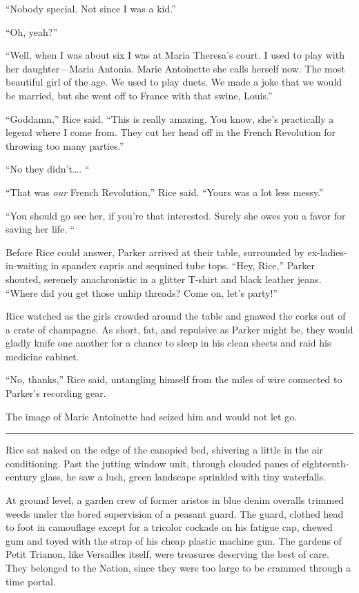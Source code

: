 ``Nobody special. Not since I was a kid.''

``Oh, yeah?''

``Well, when I was about six I was at Maria Theresa's court. I used to play with her daughter—Maria Antonia. Marie Antoinette she calls herself now. The most beautiful girl of the age. We used to play duets. We made a joke that we would be married, but she went off to France with that swine, Louis.''

``Goddamn,'' Rice said. ``This is really amazing. You know, she's practically a legend where I come from. They cut her head off in the French Revolution for throwing too many parties.''

``No they didn't\ldots. ``

``That was \textit{our} French Revolution,'' Rice said. ``Yours was a lot less messy.''

``You should go see her, if you're that interested. Surely she owes you a favor for saving her life. ``

Before Rice could answer, Parker arrived at their table, surrounded by ex-ladies-in-waiting in spandex capris and sequined tube tops. ``Hey, Rice,'' Parker shouted, serenely anachronistic in a glitter T-shirt and black leather jeans. ``Where did you get those unhip threads? Come on, let's party!''

Rice watched as the girls crowded around the table and gnawed the corks out of a crate of champagne. As short, fat, and repulsive as Parker might be, they would gladly knife one another for a chance to sleep in his clean sheets and raid his medicine cabinet.

``No, thanks,'' Rice said, untangling himself from the miles of wire connected to Parker's recording gear.

The image of Marie Antoinette had seized him and would not let go.

\fancybreak{* * *}

Rice sat naked on the edge of the canopied bed, shivering a little in the air conditioning. Past the jutting window unit, through clouded panes of eighteenth-century glass, he saw a lush, green landscape sprinkled with tiny waterfalls.

At ground level, a garden crew of former aristos in blue denim overalls trimmed weeds under the bored supervision of a peasant guard. The guard, clothed head to foot in camouflage except for a tricolor cockade on his fatigue cap, chewed gum and toyed with the strap of his cheap plastic machine gun. The gardens of Petit Trianon, like Versailles itself, were treasures deserving the best of care. They belonged to the Nation, since they were too large to be crammed through a time portal.

